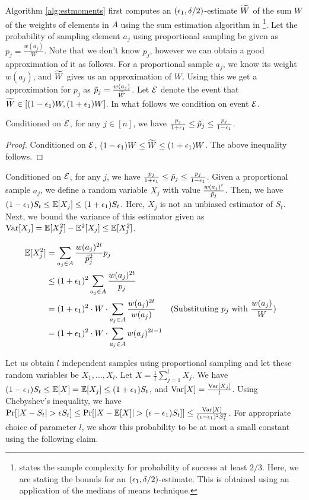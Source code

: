 Algorithm \ref{alg:estmoments} first computes an $(\epsilon_1,\delta/2)$-estimate $\widetilde{W}$ of the sum $W$ of the weights of elements in $A$ using the sum estimation algorithm in \cite{BT2022}\footnote{\cite{BT2022} states the sample complexity for probability of success at least $2/3$. Here, we are stating the bounds for an $(\epsilon_1,\delta/2)$-estimate. This is obtained using an application of the medians of means technique.}. Let the probability of sampling element $a_j$ using proportional sampling be given as $p_j=\frac{w(a_j)}{W}$. Note that we don't know $p_j$, however we can obtain a good approximation of it as follows. For a proportional sample $a_j$, we know its weight $w(a_j)$, and $\widetilde{W}$ gives us an approximation of $W$. Using this we get a approximation for $p_j$ as $\tilde{p}_j=\frac{w(a_j)}{\widetilde{W}}$. Let $\mathcal{E}$ denote the event that $\widetilde{W}\in [(1-\epsilon_1)W,(1+\epsilon_1)W]$. In what follows we condition on event $\mathcal{E}$.

\begin{claim}\label{claim:prob} Conditioned on $\mathcal{E}$, for any $j\in [n]$, we have $\frac{p_j}{1+\epsilon_1}\leq \tilde{p}_j\leq \frac{p_j}{1-\epsilon_1}$. \end{claim}
\begin{proof} Conditioned on $\mathcal{E}$, $(1-\epsilon_1)W\leq \widetilde{W}\leq (1+\epsilon_1)W$. The above inequality follows. \end{proof}

Conditioned on $\mathcal{E}$, for any $j$, we have $\frac{p_j}{1+\epsilon_1}\leq \tilde{p}_j\leq \frac{p_j}{1-\epsilon_1}$. Given a proportional sample $a_j$, we define a random variable $X_j$ with value $\frac{w(a_j)^t}{\tilde{p}_j}$. Then, we have $(1-\epsilon_1)S_t\leq \mathbb{E}[X_j]\leq (1+\epsilon_1)S_t$. Here, $X_j$ is not an unbiased estimator of $S_t$. Next, we bound the variance of this estimator given as $\mathrm{Var}[X_j]=\mathbb{E}[X_j^2]-\mathbb{E}^2[X_j]\leq \mathbb{E}[X_j^2]$. 

\begin{align}
\mathbb{E}[X_j^2]
& = \sum_{a_j\in A} \frac{w(a_j)^{2t}}{\tilde{p}_j^2} p_j \nonumber\\
& \leq (1+\epsilon_1)^2 \sum_{a_j\in A} \frac{w(a_j)^{2t}}{p_j} \nonumber\\
& = (1+\epsilon_1)^2 \cdot W \cdot \sum_{a_j\in A} \frac{w(a_j)^{2t}}{w(a_j)} && \text{(Substituting $p_j$ with $\frac{w(a_j)}{W}$)} \nonumber\\
& = (1+\epsilon_1)^2 \cdot W \cdot \sum_{a_j\in A} w(a_j)^{2t-1} \label{eqn:upper-sample}
\end{align}

Let us obtain $l$ independent samples using proportional sampling and let these random variables be $X_1,\ldots,X_l$. Let $X=\frac{1}{l} \sum_{j=1}^l X_j$. We have $(1-\epsilon_1)S_t\leq \mathbb{E}[X]=\mathbb{E}[X_j]\leq (1+\epsilon_1)S_t$, and $\mathrm{Var}[X]=\frac{\mathrm{Var}[X_j]}{l}$. Using Chebyshev's inequality, we have $\Pr[|X-S_t|>\eps S_t]\leq \Pr[|X-\EE[X]|>(\eps-\eps_1) S_t]]\leq \frac{\var[X]}{(\eps-\eps_1)^2 S_t^2}$. For appropriate choice of parameter $l$, we show this probability to be at most a small constant using the following claim. 


